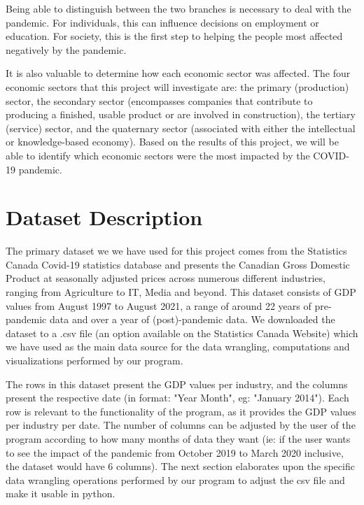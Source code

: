 \documentclass[fontsize=11pt]{article}
\begin{document}
Being able to distinguish between the two branches is necessary to deal with the pandemic. For individuals, this can influence decisions on employment or education. For society,  this is the first step to helping the people most affected negatively by the pandemic.

It is also valuable to determine how each economic sector was affected. The four economic sectors that this project will investigate are: the primary (production) sector, the secondary sector (encompasses companies that contribute to producing a finished, usable product or are involved in construction), the tertiary (service) sector, and the quaternary sector (associated with either the intellectual or knowledge-based economy). Based on the results of this project, we will be able to identify which economic sectors were the most impacted by the COVID-19 pandemic.  

\section{Dataset Description}

The primary dataset we we have used for this project comes from the Statistics Canada Covid-19 statistics database and presents the Canadian Gross Domestic Product at seasonally adjusted prices across numerous different industries, ranging from Agriculture to IT, Media and beyond. This dataset consists of GDP values from August 1997 to August 2021, a range of around 22 years of pre-pandemic data and over a year of (post)-pandemic data. We downloaded the dataset to a .csv file (an option available on the Statistics Canada Website) which we have used as the main data source for the data wrangling, computations and visualizations performed by our program.

\medskip

The rows in this dataset present the GDP values per industry, and the columns present the respective date (in format: "Year Month", eg: "January 2014"). Each row is relevant to the functionality of the program, as it provides the GDP values per industry per date. The number of columns can be adjusted by the user of the program according to how many months of data they want (ie: if the user wants to see the impact of the pandemic from October 2019 to March 2020 inclusive, the dataset would have 6 columns). The next section elaborates upon the specific data wrangling operations performed by our program to adjust the csv file and make it usable in python.
\end{document}

